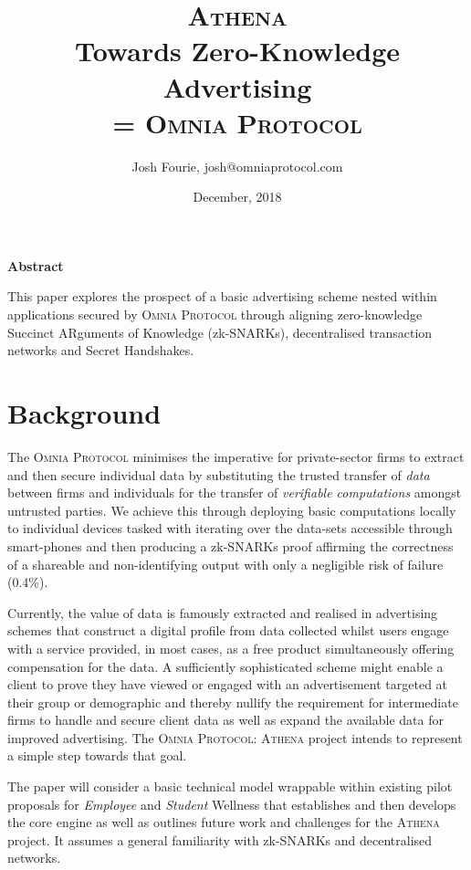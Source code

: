 \documentclass{article}
\title{\textsc{Athena} \\ Towards Zero-Knowledge Advertising\\
	\parskip = \baselineskip
	\large{\textsc{Omnia Protocol}}}
\author{Josh Fourie, josh@omniaprotocol.com}
\date{December, 2018}
\begin{document}
\maketitle
	
	\begin{center}
	\textbf{Abstract}
	\end{center}

This paper explores the prospect of a basic advertising scheme nested within applications secured by \textsc{Omnia Protocol} through aligning zero-knowledge Succinct ARguments of Knowledge (zk-SNARKs), decentralised transaction networks and Secret Handshakes. 

\pagebreak 
	
	\section{Background}
	
		The \textsc{Omnia Protocol} minimises the imperative for private-sector firms to extract and then secure individual data by substituting the trusted transfer of \textit{data} between firms and individuals for the transfer of \textit{verifiable computations} amongst untrusted parties. We achieve this through deploying basic computations locally to individual devices tasked with iterating over the data-sets accessible through smart-phones and then producing a zk-SNARKs proof affirming the correctness of a shareable and non-identifying output with only a negligible risk of failure (0.4\%).
		
		Currently, the value of data is famously extracted and realised in advertising schemes that construct a digital profile from data collected whilst users engage with a service provided, in most cases, as a free product simultaneously offering compensation for the data. A sufficiently sophisticated scheme might enable a client to prove they have viewed or engaged with an advertisement targeted at their group or demographic and thereby nullify the requirement for intermediate firms to handle and secure client data as well as expand the available data for improved advertising. The  \textsc{Omnia Protocol: Athena} project intends to represent a simple step towards that goal.
		
		The paper will consider a basic technical model wrappable within existing pilot proposals for \textit{Employee} and \textit{Student} Wellness that establishes and then develops the core engine  as well as outlines future work and challenges for the \textsc{Athena} project. It assumes a general familiarity with zk-SNARKs and decentralised networks.
		
\end{document}
